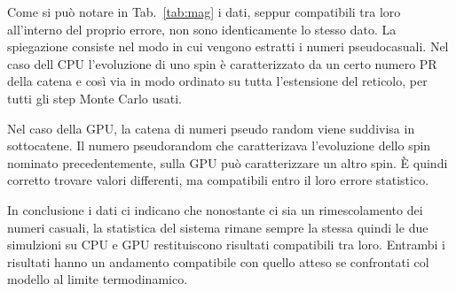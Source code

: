 \documentclass[a4paper,12pt]{article}
\begin{document}
Come si può notare in Tab.~\ref{tab:mag} i dati, seppur compatibili tra loro all'interno del proprio errore, non sono identicamente lo stesso dato. La spiegazione consiste nel modo in cui vengono estratti i numeri pseudocasuali. Nel caso dell CPU l'evoluzione di uno spin è caratterizzato da un certo numero PR della catena e così via in modo ordinato su tutta l'estensione del reticolo, per tutti gli step Monte Carlo usati. 

Nel caso della GPU, la catena di numeri pseudo random viene suddivisa in sottocatene. Il numero pseudorandom che caratterizava l'evoluzione dello spin nominato precedentemente, sulla GPU può caratterizzare un altro spin. \`E  quindi corretto trovare valori differenti, ma compatibili entro il loro errore statistico. 

In conclusione i dati ci indicano che nonostante ci sia un rimescolamento dei numeri casuali, la statistica del sistema rimane sempre la stessa quindi le due simulzioni su CPU e GPU restituiscono risultati compatibili tra loro. Entrambi i risultati hanno un andamento compatibile con quello atteso se confrontati col modello al limite termodinamico.   
\end{document}
